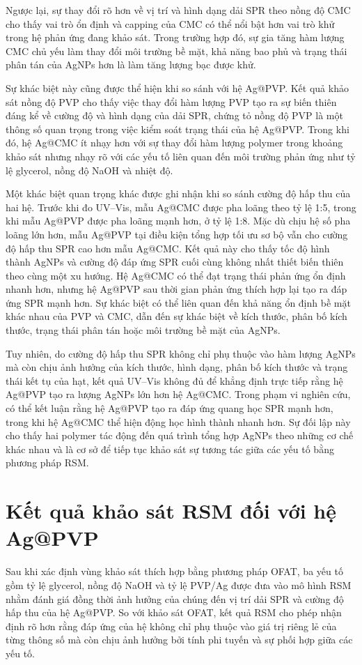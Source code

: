 Ngược lại, sự thay đổi rõ hơn về vị trí và hình dạng dải SPR theo nồng độ CMC cho thấy vai trò ổn định và capping của CMC có thể nổi bật hơn vai trò khử trong hệ phản ứng đang khảo sát. 
Trong trường hợp đó, sự gia tăng hàm lượng CMC chủ yếu làm thay đổi môi trường bề mặt, khả năng bao phủ và trạng thái phân tán của AgNPs hơn là làm tăng lượng bạc được khử.

Sự khác biệt này cũng được thể hiện khi so sánh với hệ Ag@PVP. 
Kết quả khảo sát nồng độ PVP cho thấy việc thay đổi hàm lượng PVP tạo ra sự biến thiên đáng kể về cường độ và hình dạng của dải SPR, chứng tỏ nồng độ PVP là một thông số quan trọng trong việc kiểm soát trạng thái của hệ Ag@PVP. 
Trong khi đó, hệ Ag@CMC ít nhạy hơn với sự thay đổi hàm lượng polymer trong khoảng khảo sát nhưng nhạy rõ với các yếu tố liên quan đến môi trường phản ứng như tỷ lệ glycerol, nồng độ NaOH và nhiệt độ.

Một khác biệt quan trọng khác được ghi nhận khi so sánh cường độ hấp thu của hai hệ. 
Trước khi đo UV–Vis, mẫu Ag@CMC được pha loãng theo tỷ lệ 1:5, trong khi mẫu Ag@PVP được pha loãng mạnh hơn, ở tỷ lệ 1:8. 
Mặc dù chịu hệ số pha loãng lớn hơn, mẫu Ag@PVP tại điều kiện tổng hợp tối ưu sơ bộ vẫn cho cường độ hấp thu SPR cao hơn mẫu Ag@CMC. 
Kết quả này cho thấy tốc độ hình thành AgNPs và cường độ đáp ứng SPR cuối cùng không nhất thiết biến thiên theo cùng một xu hướng. 
Hệ Ag@CMC có thể đạt trạng thái phản ứng ổn định nhanh hơn, nhưng hệ Ag@PVP sau thời gian phản ứng thích hợp lại tạo ra đáp ứng SPR mạnh hơn. 
Sự khác biệt có thể liên quan đến khả năng ổn định bề mặt khác nhau của PVP và CMC, dẫn đến sự khác biệt về kích thước, phân bố kích thước, trạng thái phân tán hoặc môi trường bề mặt của AgNPs.

Tuy nhiên, do cường độ hấp thu SPR không chỉ phụ thuộc vào hàm lượng AgNPs mà còn chịu ảnh hưởng của kích thước, hình dạng, phân bố kích thước và trạng thái kết tụ của hạt, kết quả UV–Vis không đủ để khẳng định trực tiếp rằng hệ Ag@PVP tạo ra lượng AgNPs lớn hơn hệ Ag@CMC. 
Trong phạm vi nghiên cứu, có thể kết luận rằng hệ Ag@PVP tạo ra đáp ứng quang học SPR mạnh hơn, trong khi hệ Ag@CMC thể hiện động học hình thành nhanh hơn. 
Sự đối lập này cho thấy hai polymer tác động đến quá trình tổng hợp AgNPs theo những cơ chế khác nhau và là cơ sở để tiếp tục khảo sát sự tương tác giữa các yếu tố bằng phương pháp RSM.

\section{Kết quả khảo sát RSM đối với hệ Ag@PVP}
Sau khi xác định vùng khảo sát thích hợp bằng phương pháp OFAT, ba yếu tố gồm tỷ lệ glycerol, nồng độ NaOH và tỷ lệ PVP/Ag được đưa vào mô hình RSM nhằm đánh giá đồng thời ảnh hưởng của chúng đến vị trí dải SPR và cường độ hấp thu của hệ Ag@PVP. 
So với khảo sát OFAT, kết quả RSM cho phép nhận định rõ hơn rằng đáp ứng của hệ không chỉ phụ thuộc vào giá trị riêng lẻ của từng thông số mà còn chịu ảnh hưởng bởi tính phi tuyến và sự phối hợp giữa các yếu tố.


